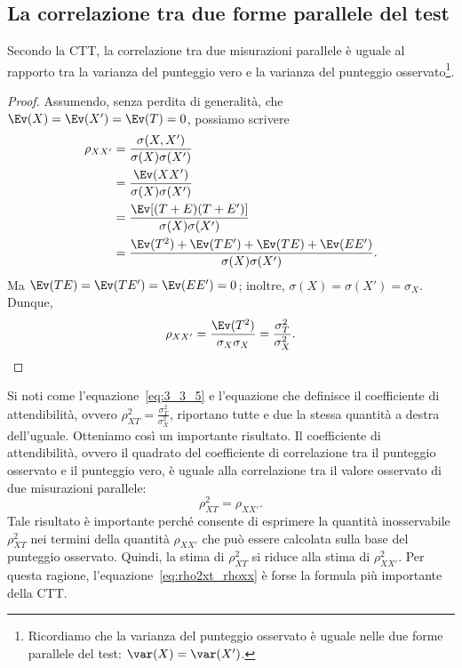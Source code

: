 \subsection{La correlazione tra due forme parallele del test}

Secondo la CTT, la correlazione tra due misurazioni parallele è uguale al rapporto tra la varianza del punteggio vero e la varianza del punteggio osservato\footnote{Ricordiamo che la varianza del punteggio osservato è uguale nelle due forme parallele del test: $\var(X) = \var(X')$.}.

\begin{proof}
Assumendo, senza perdita di generalità, che $\Ev(X)=\Ev(X')=\Ev(T)=0$, possiamo scrivere
\begin{align}
\rho_{X X'} &= \frac{\sigma(X, X')}{\sigma(X) \sigma(X')}\notag\\
&= \frac{\Ev(XX')}{\sigma(X) \sigma(X')}\notag\\
&=\frac{\Ev[(T+E)(T+E')]}{\sigma(X) \sigma(X')}\notag\\
&=\frac{\Ev(T^2)+\Ev(TE')+\Ev(TE)+ \Ev(EE')}{\sigma(X) \sigma(X')}.\notag
\end{align}
Ma $\Ev(TE) = \Ev(TE') = \Ev(EE')=0$; inoltre, $\sigma(X) =\sigma(X')= \sigma_X$.
  Dunque, 
\begin{equation}
\rho_{X X'} =\frac{\Ev(T^2)}{\sigma_X \sigma_X} = \frac{\sigma^2_T}{\sigma^2_X}.
\label{eq:3_3_5}
\end{equation}
\end{proof}

Si noti come l'equazione~\ref{eq:3_3_5}
e l'equazione che definisce il coefficiente di attendibilità, ovvero
$
\rho_{XT}^2 = \frac{\sigma_{T}^2}{\sigma_X^2}
$, 
riportano tutte e due la stessa quantità a destra dell'uguale. Otteniamo così un importante risultato. Il coefficiente di attendibilità, ovvero il quadrato del coefficiente di correlazione tra il punteggio osservato e il punteggio vero, è uguale alla correlazione tra il valore osservato di due misurazioni parallele:
\begin{equation}
\rho^2_{XT} =  \rho_{XX'}.
\label{eq:rho2xt_rhoxx}
\end{equation}
Tale risultato è importante perché consente di esprimere la quantità inosservabile $\rho^2_{XT}$ nei termini della quantità $\rho_{XX'}$ che può essere calcolata sulla base del punteggio osservato. Quindi, la stima di  $\rho^2_{XT}$ si riduce alla stima di  $\rho^2_{XX'}$. Per questa ragione, l'equazione~\ref{eq:rho2xt_rhoxx} è forse la formula più importante della CTT.

